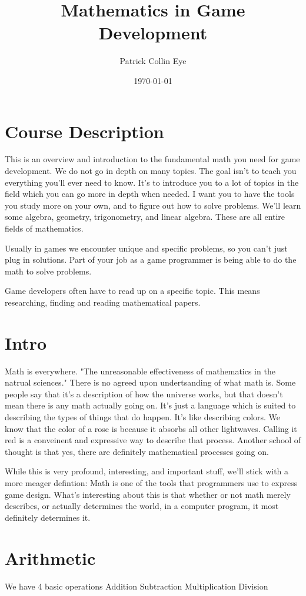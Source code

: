 \documentclass[11pt]{article}
\author{Patrick Collin Eye}
\date{\today}
\title{Mathematics in Game Development}
\begin{document}
\maketitle
\tableofcontents


\section{Course Description}
\label{sec-1}
This is an overview and introduction to the fundamental math you need for game development. 
We do not go in depth on many topics. 
The goal isn't to teach you everything you'll ever need to know. It's to introduce you to a lot of topics in the field which you can go more in depth when needed. I want you to have the tools you study more on your own, and to figure out how to solve problems. 
We'll learn some algebra, geometry, trigonometry, and linear algebra. These are all entire fields of mathematics. 

Usually in games we encounter unique and specific problems, so you can't just plug in solutions. Part of your job as a game programmer is being able to do the math to solve problems.

Game developers often have to read up on a specific topic. This means researching, finding and reading mathematical papers.
\section{Intro}
\label{sec-2}
Math is everywhere. 
"The unreasonable effectiveness of mathematics in the natrual sciences."
There is no agreed upon undertsanding of what math is. Some people say that it's a description of how the universe works, but that doesn't mean there is any math actually going on. It's just a language which is suited to describing the types of things that do happen. It's like describing colors. We know that the color of a rose is because it absorbs all other lightwaves. Calling it red is a conveinent and expressive way to describe that process. 
Another school of thought is that yes, there are definitely mathematical processes going on. 

While this is very profound, interesting, and important stuff, we'll stick with a more meager defintion: Math is one of the tools that programmers use to express game design. 
What's interesting about this is that whether or not math merely describes, or actually determines the world, in a computer program, it most definitely determines it. 
\section{Arithmetic}
\label{sec-3}
We have 4 basic operations
Addition
Subtraction
Multiplication
Division
\end{document}
